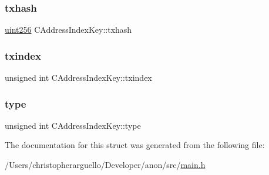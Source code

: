 \mbox{\label{struct_c_address_index_key_aa54b421311b483ac6e3ee6581346854c}} 
\subsubsection{\texorpdfstring{txhash}{txhash}}
{\footnotesize\ttfamily \mbox{\hyperlink{classuint256}{uint256}} C\+Address\+Index\+Key\+::txhash}

\mbox{\label{struct_c_address_index_key_ac95b9f75bf63e62eb2018f20caac3b72}} 
\subsubsection{\texorpdfstring{txindex}{txindex}}
{\footnotesize\ttfamily unsigned int C\+Address\+Index\+Key\+::txindex}

\mbox{\label{struct_c_address_index_key_a4334d32bb8e25f06a66c1468278fa661}} 
\subsubsection{\texorpdfstring{type}{type}}
{\footnotesize\ttfamily unsigned int C\+Address\+Index\+Key\+::type}



The documentation for this struct was generated from the following file\+:\begin{DoxyCompactItemize}
\item 
/\+Users/christopherarguello/\+Developer/anon/src/\mbox{\hyperlink{main_8h}{main.\+h}}\end{DoxyCompactItemize}
